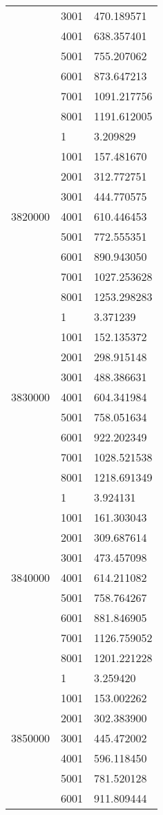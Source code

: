 \begin{table}[htb!]
\begin{tabular}{lll}
 & 3001 & 470.189571 \\
 & 4001 & 638.357401 \\
 & 5001 & 755.207062 \\
 & 6001 & 873.647213 \\
 & 7001 & 1091.217756 \\
 & 8001 & 1191.612005 \\
\multirow[c]{9}{*}{3820000} & 1 & 3.209829 \\
 & 1001 & 157.481670 \\
 & 2001 & 312.772751 \\
 & 3001 & 444.770575 \\
 & 4001 & 610.446453 \\
 & 5001 & 772.555351 \\
 & 6001 & 890.943050 \\
 & 7001 & 1027.253628 \\
 & 8001 & 1253.298283 \\
\multirow[c]{9}{*}{3830000} & 1 & 3.371239 \\
 & 1001 & 152.135372 \\
 & 2001 & 298.915148 \\
 & 3001 & 488.386631 \\
 & 4001 & 604.341984 \\
 & 5001 & 758.051634 \\
 & 6001 & 922.202349 \\
 & 7001 & 1028.521538 \\
 & 8001 & 1218.691349 \\
\multirow[c]{9}{*}{3840000} & 1 & 3.924131 \\
 & 1001 & 161.303043 \\
 & 2001 & 309.687614 \\
 & 3001 & 473.457098 \\
 & 4001 & 614.211082 \\
 & 5001 & 758.764267 \\
 & 6001 & 881.846905 \\
 & 7001 & 1126.759052 \\
 & 8001 & 1201.221228 \\
\multirow[c]{9}{*}{3850000} & 1 & 3.259420 \\
 & 1001 & 153.002262 \\
 & 2001 & 302.383900 \\
 & 3001 & 445.472002 \\
 & 4001 & 596.118450 \\
 & 5001 & 781.520128 \\
 & 6001 & 911.809444 \\

\end{tabular}
\end{table}
